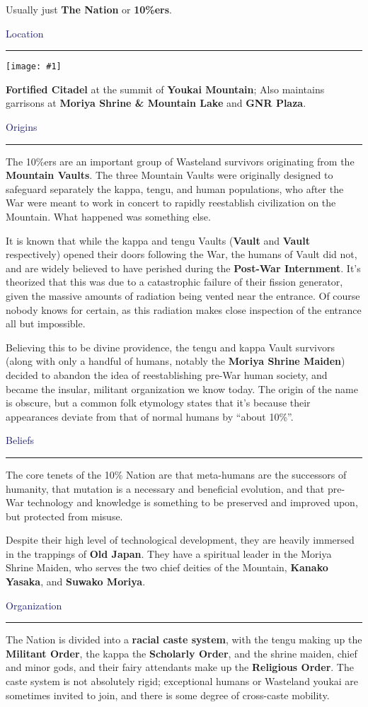\documentclass[a4paper,12pt]{book}
\newcommand{\maru}[1]{\raisebox{.5pt}{\textcircled{\raisebox{-.9pt} {#1}}}}
\newcommand{\img}[1]{%
	\texttt{[image: \#1]}%
}
\newcommand{\factionheading}[1]{
\parbox{\textwidth}{
        \vspace{2mm}
        \noindent
        \textcolor{MidnightBlue}{
{\large {#1}
        \vspace*{1mm}
        \hrule}
        \vspace*{3mm}
        \noindent
} } }
\begin{document}
Usually just \textbf{The Nation} or \textbf{10\%ers}.


\factionheading{Location}

\img{youkai-mountain}

\textbf{Fortified Citadel} at the summit of \textbf{Youkai Mountain}; Also maintains garrisons at \textbf{Moriya Shrine \& Mountain Lake} and \textbf{GNR Plaza}.

\newpage
\factionheading{Origins}
The 10\%ers are an important group of Wasteland survivors originating from the \textbf{Mountain Vaults}. The three Mountain Vaults were originally designed to safeguard separately the kappa, tengu, and human populations, who after the War were meant to work in concert to rapidly reestablish civilization on the Mountain. What happened was something else.

It is known that while the kappa and tengu Vaults (\textbf{Vault \maru{11}} and \textbf{Vault \maru{12}} respectively) opened their doors following the War, the humans of {Vault \maru{13}} did not, and are widely believed to have perished during the \textbf{Post-War Internment}. It's theorized that this was due to a catastrophic failure of their fission generator, given the massive amounts of radiation being vented near the entrance. Of course nobody knows for certain, as this radiation makes close inspection of the entrance all but impossible.

Believing this to be divine providence, the tengu and kappa Vault survivors (along with only a handful of humans, notably the \textbf{Moriya Shrine Maiden}) decided to abandon the idea of reestablishing pre-War human society, and became the insular, militant organization we know today. The origin of the name is obscure, but a common folk etymology states that it's because their appearances deviate from that of normal humans by ``about 10\%''.

\factionheading{Beliefs}
The core tenets of the 10\% Nation are that meta-humans are the successors of humanity, that mutation is a necessary and beneficial evolution, and that pre-War technology and knowledge is something to be preserved and improved upon, but protected from misuse.

Despite their high level of technological development, they are heavily immersed in the trappings of \textbf{Old Japan}. They have a spiritual leader in the Moriya Shrine Maiden, who serves the two chief deities of the Mountain, \textbf{Kanako Yasaka}, and \textbf{Suwako Moriya}.

\factionheading{Organization}
The Nation is divided into a \textbf{racial caste system}, with the tengu making up the \textbf{Militant Order}, the kappa the \textbf{Scholarly Order}, and the shrine maiden, chief and minor gods, and their fairy attendants make up the \textbf{Religious Order}. The caste system is not absolutely rigid; exceptional humans or Wasteland youkai are sometimes invited to join, and there is some degree of cross-caste mobility.
\end{document}
